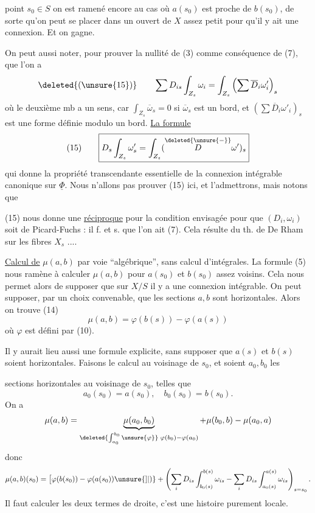 point $s_0\in S$ on est ramené encore au cas où $a(s_0)$ est proche de $b(s_0)$, de sorte qu'on peut  se placer dans un ouvert de $X$ assez petit pour qu'il y ait une connexion. Et on gagne.

On peut aussi noter,  pour prouver la  nullité de (3) comme conséquence de (7), que l'on a
\[
\deleted{(\unsure{15})}\qquad \sum D_{is}\int_{Z_s}\omega_i=\int_{Z_s}\left(\sum\overline D_i\omega'_i\right)_s
\]
où le deuxième mb a un sens, car $\int_{Z_s}\overline\omega_s=0$ si $\overline\omega_s$ est un bord, et $\left(\sum\overline D_i\omega'_i\right)_s$ est une forme définie modulo un bord. \uline{La formule }  
\[
(15)\qquad\boxed{D_s\int_{Z_s}\omega'_s=\int_{Z_s}(\overset{\deleted{\unsure{-}}}{D}\omega')_s}
\]
qui donne la propriété transcendante essentielle de la connexion intégrable canonique sur $\underline\Phi$. Nous n'allons pas prouver (15) ici, et l'admettrons, mais notons que

(15) nous donne une \uline{réciproque} pour la condition envisagée pour que $(D_i,\omega_i)$ soit de Picard-Fuchs : il f. et s. que l'on ait (7). Cela résulte du th. de De Rham sur les fibres $X_s$ ....

\uline{Calcul de} $\mu(a,b)$ par voie ``algébrique'', sans calcul d'intégrales.  La formule (5) nous ramène à calculer $\mu(a,b)$  pour  $a(s_0)$ et $b(s_0)$ assez voisins. Cela nous permet alors de supposer que sur $X/S$ il y a une connexion intégrable. On peut  supposer, par un choix convenable, que les sections $a,b$ sont horizontales. Alors on trouve (14)
\[
\mu(a,b)=\varphi(b(s))-\varphi(a(s))
\]
où $\varphi$ est défini par (10).

Il y aurait lieu  aussi une formule explicite, sans supposer que $a(s)$ et $b(s)$ soient horizontales. Faisons le calcul au voisinage de $s_0$, et soient $a_0,b_0$ les

sections horizontales au voisinage de $s_0$, telles que
\[
a_0(s_0)=a(s_0),\quad b_0(s_0)=b(s_0).
\]
On a
\[
\mu(a,b)=\underbrace{\mu(a_0,b_0)}_{\deleted{\int_{a_0}^{b_0}\unsure{\varphi}}\;\varphi(b_0)-\varphi(a_0)}
+\mu(b_0,b)-\mu(a_0,a)
\]
donc
\[
\mu(a,b)(s_0)=\bigl[\varphi(b(s_0))-\varphi(a(s_0))\unsure{]|)}
+\left(\sum_i D_{is}\int_{b_0(s)}^{b(s)}\omega_{is}
-\sum_i D_{is}\int_{a_0(s)}^{a(s)}\omega_{is}\right)_{s=s_0}.
\]
Il faut calculer les deux termes de droite, c'est une histoire purement locale.

